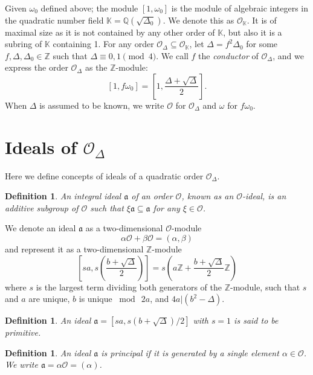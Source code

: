 \documentclass{ucalgthes1}
\newtheorem{defn}[thm]{Definition}
\newcommand{\KK}{\mathbb{K}}
\newcommand{\OO}{\mathcal{O}}
\newcommand{\ZZ}{\mathbb{Z}}
\newcommand{\QQ}{\mathbb{Q}}
\begin{document}
\bigbreak
Given $\omega_0$ defined above; the module $[1, \omega_0]$ is the module of algebraic integers in the quadratic number field $\KK=\QQ(\sqrt{\Delta_0})$.  We denote this as $\OO_{\KK}$.  It is of maximal size as it is not contained by any other order of $\KK$, but also it is a subring of $\KK$ containing 1.  For any order $\OO_\Delta \subseteq \OO_\KK$, let $\Delta = f^2 \Delta_0$ for some $f, \Delta, \Delta_0 \in \ZZ$ such that $\Delta \equiv 0,1 \pmod 4$.  We call $f$ the \emph{conductor} of $\OO_\Delta$, and we express the order $\OO_\Delta$ as the $\ZZ$-module:
\[
	[1,f\omega_0] = \left[1, \frac{\Delta + \sqrt{\Delta}}{2} \right].
\]
When $\Delta$ is assumed to be known, we write $\OO$ for $\OO_\Delta$ and $\omega$ for $f\omega_0$.

\bigbreak
\section{Ideals of $\OO_\Delta$}

Here we define concepts of ideals of a quadratic order $\OO_\Delta$.

\begin{defn}
An integral \emph{ideal} $\mathfrak{a}$ of an order $\OO$, known as an $\OO$-ideal, is an additive subgroup of $\OO$ such that $\xi \mathfrak{a} \subseteq \mathfrak{a}$ for any $\xi \in \OO$.
\end{defn}
\noindent
We denote an ideal $\mathfrak{a}$ as a two-dimensional $\OO$-module
\[
	\alpha \OO + \beta \OO = (\alpha, \beta)
\]
and represent it as a two-dimensional $\ZZ$-module
\begin{equation}
\label{eq:idealZModule}
	\left[sa, s\left( \frac{b+ \sqrt{\Delta}}{2} \right) \right] = s \left(a \ZZ + \frac{b + \sqrt{\Delta}}{2} \ZZ \right)
\end{equation}
where $s$ is the largest term dividing both generators of the $\ZZ$-module, such that $s$ and $a$ are unique, $b$ is unique $\bmod~2a$, and $4a | (b^2-\Delta)$.

\begin{defn}
An ideal $\mathfrak{a} = [sa, s(b+\sqrt{\Delta})/2]$ with $s=1$ is said to be \emph{primitive}.
\end{defn}

\begin{defn}
An ideal $\mathfrak{a}$ is \emph{principal} if it is generated by a single element $\alpha \in \OO$. We write $\mathfrak{a} = \alpha \OO = (\alpha)$.
\end{defn}
\end{document}
